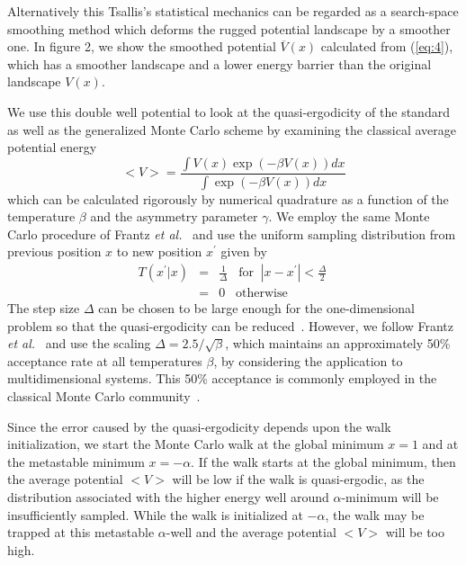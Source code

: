 Alternatively this Tsallis's statistical mechanics can be regarded
as a search-space smoothing method which deforms the rugged potential
landscape by a smoother one. In figure 2, we show the smoothed
potential $\overline{V}(x)$ calculated from (\ref{eq:4}), which has
a smoother landscape and a lower energy barrier than the
original landscape $V(x)$.

We use this double well potential to look at the quasi-ergodicity
of the standard as well as the generalized Monte Carlo scheme by
examining the classical average potential energy~\cite{FFD}
\begin{equation}
<V>=\frac{\int V(x)\exp\left(-\beta V(x)\right)dx}
{\int \exp\left(-\beta V(x)\right)dx }
\label{eq:16}
\end{equation}
which can be calculated rigorously by numerical quadrature as a
function of the temperature $\beta$ and the asymmetry parameter
$\gamma$. We employ the same Monte Carlo procedure of Frantz
{\it et al.}~\cite{FFD} and use the uniform sampling distribution
from previous position $x$ to new position $x^{'}$ given by
\begin{eqnarray}
T(x^{'}|x)&=&\frac{1}{\Delta}\;\;\;\mbox{for}
\;\;|x-x^{'}|<\frac{\Delta}{2}\ \nonumber \\
&=& 0\;\;\;\mbox{otherwise}
\label{eq:17}
\end{eqnarray}
The step size $\Delta$ can be chosen to be large enough for the
one-dimensional problem so that the quasi-ergodicity can
be reduced~\cite{FFD}. However, we follow Frantz {\it et
al.}~\cite{FFD} and use the scaling $\Delta=2.5/\sqrt{\beta}$,
which maintains an approximately 50\% acceptance rate at all
temperatures $\beta$, by considering the application to
multidimensional systems. This 50\% acceptance is commonly
employed in the classical Monte Carlo community~\cite{AT}.

Since the error caused by the quasi-ergodicity depends upon
the walk initialization, we start the Monte Carlo walk at
the global minimum $x=1$ and at the metastable minimum $x=-\alpha$.
If the walk starts at the global minimum, then the average
potential $<V>$ will be low if the walk is quasi-ergodic, as
the distribution associated with the higher energy well around
$\alpha$-minimum will be insufficiently sampled. While the walk
is initialized at $-\alpha$, the walk may be trapped at this
metastable $\alpha$-well and the average potential $<V>$
will be too high.

